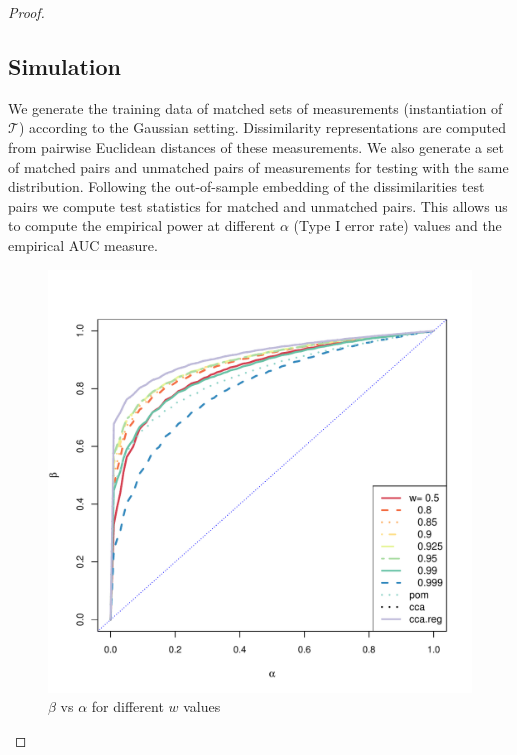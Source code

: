 \documentclass[12pt]{article} %
\begin{document}
\begin{proof}
\subsection{Simulation\label{subsec:sim}}

We generate the training data of matched sets of measurements (instantiation of $\mathcal{T}$) according to  the Gaussian setting. Dissimilarity representations are computed from pairwise Euclidean distances of these measurements. We also generate a set of matched pairs and unmatched pairs of measurements for testing with the same distribution. Following the out-of-sample embedding of the dissimilarities test pairs 
we compute test statistics  for matched and unmatched pairs. This allows us to compute the empirical power  at different $\alpha$ (Type I error rate) values and the empirical AUC measure.


\begin{figure}[h]
     \centering
\includegraphics[scale=0.35]{MVN-FC-Tradeoff-OOS-c0.pdf}
\caption{$\beta$ vs $\alpha$  for different $w$ values }
\label{fig:MVN-c0-power-alpha}
\end{figure}


\end{proof}
\end{document}
